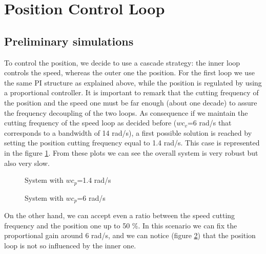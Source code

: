 \section{Position Control Loop}
\subsection{Preliminary simulations}
To control the position, we decide to use a cascade strategy: the inner loop controls the speed, whereas the outer one the position.
For the first loop we use the same PI structure as explained above, while the position is regulated by using a proportional controller.
It is important to remark that the cutting frequency of the position and the speed one must be far enough (about one decade) to assure the frequency decoupling of the two loops. As consequence if we maintain the cutting frequency of the speed loop as decided before ($wc_{v} $=6 rad/s that corresponds to a bandwidth of 14 rad/s), a first possible solution is reached by setting the position cutting frequency equal to 1.4 rad/s. This case is represented in the figure \ref{fig:System with 1.4}. From these plots we can see the overall system is very robust but also very slow.
\\

\begin{figure}[h]
\centering
{}\quad
{} 
\caption{System with $wc_{p} $=1.4 rad/s}
\label{fig:System with 1.4}
\end{figure}

\begin{figure}[h]
	\centering
	\quad
	\caption{System with $wc_{p} $=6 rad/s}
	\label{fig:System with 6}
\end{figure}

On the other hand, we can accept even a ratio between the speed cutting frequency and the position one up to 50 \%. In this scenario we can fix the proportional gain around 6 rad/s, and we can notice (figure \ref{fig:System with 6}) that the position loop is not so influenced by the inner one. 


